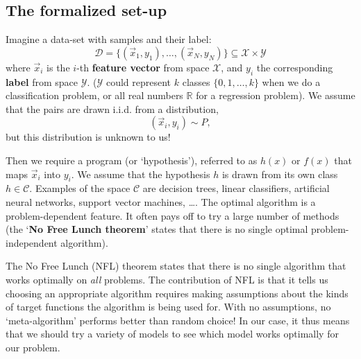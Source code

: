 \documentclass{article}
\begin{document}
\subsection{The formalized set-up}
Imagine a data-set with samples and their label:
\begin{equation}
    \mathcal{D} = \Bigg\{ (\vec{x}_1,y_1), \dots, (\vec{x}_N,y_N) \Bigg\} \subseteq \mathcal{X}\times\mathcal{Y}
\end{equation}
where $\vec{x}_i$ is the $i$-th \textbf{feature vector} from space $\mathcal{X}$, and $y_i$ the corresponding \textbf{label} from space $\mathcal{Y}$. ($\mathcal{Y}$ could represent $k$ classes $\{0,1,\dots,k\}$ when we do a classification problem, or all real numbers $\mathbb{R}$ for a regression problem). We assume that the pairs are drawn i.i.d. from a distribution,
\begin{equation}
    (\vec{x}_i,y_i) \sim P,
\end{equation}
but this distribution is unknown to us!

Then we require a program (or `hypothesis'), referred to as $h(x)$ or $f(x)$ that maps $\vec{x}_i$ into $y_i$. We assume that the hypothesis $h$ is drawn from its own class $h\in\mathcal{C}$. Examples of the space $\mathcal{C}$ are decision trees, linear classifiers, artificial neural networks, support vector machines, \dots. The optimal algorithm is a problem-dependent feature. It often pays off to try a large number of methods (the `\textbf{No Free Lunch theorem}' states that there is no single optimal problem-independent algorithm).
\begin{spexample}
    The No Free Lunch (NFL) theorem states that there is no single algorithm that works optimally on \textit{all} problems. The contribution of NFL is that it tells us choosing an appropriate algorithm requires making assumptions about the kinds of target functions the algorithm is being used for. With no assumptions, no `meta-algorithm' performs better than random choice! In our case, it thus means that we should try a variety of models to see which model works optimally for our problem.
\end{spexample}
\end{document}
